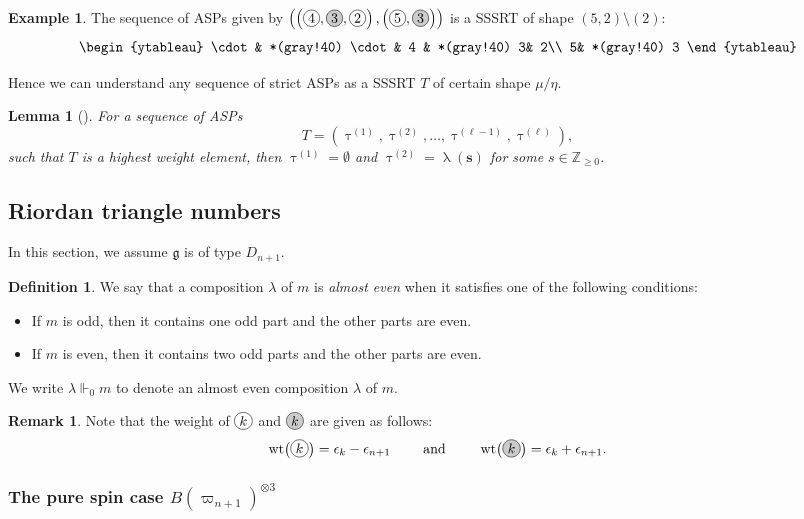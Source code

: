 \documentclass[11pt, leqno]{amsart}
\theoremstyle{plain}
\newtheorem{lemma}[theorem]{Lemma}
\theoremstyle{definition}
\newtheorem{definition}[theorem]{Definition}
\newtheorem{example}[theorem]{Example}
\newtheorem{remark}[theorem]{Remark}
\numberwithin{equation}{section}
\newcommand{\g}{\mathfrak{g}}
\newcommand{\fw}{\varpi} %
\newcommand{\ntau}[1]{\btau^{(#1)}}
\newcommand{\cn}[1]{\mathbf{#1}}
\newcommand{\btau}{\uptau}
\newcommand*\gn[1]{\tikz[baseline=(char.base)]{%
            \node[shape=circle,fill=gray!40,draw,inner sep=1.3pt] (char) {#1};}}
\newcommand*\nn[1]{\tikz[baseline=(char.base)]{%
            \node[shape=circle,draw,inner sep=1.3pt] (char) {#1};}}
\newcommand{\Z}{\mathbb{Z}}
\newcommand{\wt}{\operatorname{wt}} %
\newcommand{\defn}[1]{{\color{darkred}\emph{#1}}} %
\begin{document}
\begin{example}
The sequence of ASPs given by $\left(\left(\nn{$4$},\gn{$3$},\nn{$2$}\right),\left(\nn{$5$},\gn{$3$}\right) \right)$ is a SSSRT of shape $(5,2) \setminus (2)$:
\[
\begin{ytableau}
\cdot& *(gray!40)  \cdot &  4 & *(gray!40) 3&  2\\
5& *(gray!40) 3
\end{ytableau}
\]
\end{example}

Hence we can understand any sequence of strict ASPs as a SSSRT $T$ of certain shape $\mu / \eta$.

\begin{lemma}[{\cite[Lemma 6.1]{KLO17}}]
\label{lemma: general hw D}
For a sequence of ASPs
\[
T=\left( \ntau{1},\ntau{2},\ldots,\ntau{\ell-1},\ntau{\ell} \right),
\]
such that $T$ is a highest weight element, then $\ntau{1}=\emptyset$ and $\ntau{2}=\uplambda(\cn{s})$ for some $s \in \Z_{\ge 0}$.
\end{lemma}


\subsection{Riordan triangle numbers}
In this section, we assume $\g$ is of type $D_{n+1}$.




\begin{definition}
We say that a composition $\lambda$ of $m$ is \defn{almost even} when it satisfies one of the following conditions:
\begin{itemize}
\item If $m$ is odd, then it contains one odd part and the other parts are even.
\item If $m$ is even, then it contains two odd parts and the other parts are even.
\end{itemize}
We write $\lambda \Vdash_0 m$ to denote an almost even composition $\lambda$ of $m$.
\end{definition}

\begin{remark}\label{rmk:weight consideration}
Note that the weight of $\nn{$k$}$ and $\gn{$k$}$ are given as follows:
\[
\wt\bigl(\nn{$k$}\bigr) = \epsilon_{k}-\epsilon_{n+1} \qquad \text{ and } \qquad \wt\bigl(\gn{$k$}\bigr) = \epsilon_{k}+\epsilon_{n+1}.
\]
\end{remark}

\subsubsection{The pure spin case $B(\fw_{n+1})^{\otimes 3}$}
\end{document}
